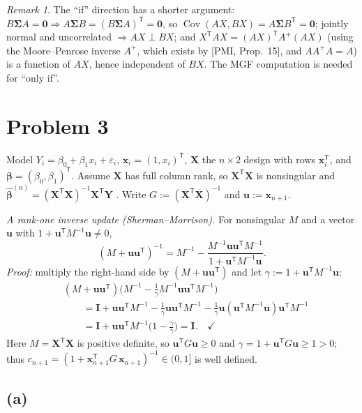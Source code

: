 \documentclass[11pt]{article}
\DeclareMathOperator{\Cov}{Cov}
\newcommand{\bX}{\mathbf{X}}
\newcommand{\bY}{\mathbf{Y}}
\newcommand{\bI}{\mathbf{I}}
\newcommand{\bx}{\mathbf{x}}
\newcommand{\bu}{\mathbf{u}}
\newcommand{\bbeta}{\bm{\beta}}
\newcommand{\bSig}{\bm{\Sigma}}
\newcommand{\T}{^{\mathsf{T}}}
\newcommand{\inv}{^{-1}}
\newcommand{\bhat}[1]{\widehat{#1}}
\theoremstyle{remark}
\newtheorem*{remark}{Remark}
\begin{document}
\begin{remark}
The ``if'' direction has a shorter argument: $B\bSig A=\mathbf0\Rightarrow A\bSig B=(B\bSig A)\T=\mathbf0$, so
$\Cov(AX,BX)=A\bSig B\T=\mathbf0$; jointly normal and uncorrelated $\Rightarrow AX\perp BX$; and
$X\T AX=(AX)\T A^{+}(AX)$ (using the Moore--Penrose inverse $A^{+}$, which exists by [PMI, Prop.~15], and
$AA^{+}A=A$) is a function of $AX$, hence independent of $BX$. The MGF computation is needed for ``only if''.
\end{remark}

\section*{Problem 3}

Model $Y_i=\beta_0+\beta_1x_i+\varepsilon_i$, $\bx_i=(1,x_i)\T$, $\bX$ the $n\times2$ design with rows
$\bx_i\T$, and $\bbeta=(\beta_0,\beta_1)\T$. Assume $\bX$ has full column rank, so $\bX\T\bX$ is nonsingular
and $\bhat{\bbeta}^{(n)}=(\bX\T\bX)\inv\bX\T\bY$ . Write $G:=(\bX\T\bX)\inv$
and $\bu:=\bx_{n+1}$.

\medskip
\noindent\emph{A rank-one inverse update (Sherman--Morrison).} For nonsingular $M$ and a vector $\bu$ with
$1+\bu\T M\inv\bu\ne0$,
\begin{equation*}
(M+\bu\bu\T)\inv=M\inv-\frac{M\inv\bu\bu\T M\inv}{1+\bu\T M\inv\bu}.
\tag{SM}
\end{equation*}
\emph{Proof:} multiply the right-hand side by $(M+\bu\bu\T)$ and let $\gamma:=1+\bu\T M\inv\bu$:
\begin{align*}
&(M+\bu\bu\T)\Big(M\inv-\tfrac{1}{\gamma}M\inv\bu\bu\T M\inv\Big)\\
&\qquad=\bI+\bu\bu\T M\inv-\tfrac1\gamma\bu\bu\T M\inv-\tfrac1\gamma\bu(\bu\T M\inv\bu)\bu\T M\inv\\
&\qquad=\bI+\bu\bu\T M\inv\Big(1-\tfrac{\gamma}{\gamma}\Big)=\bI. \quad\checkmark
\end{align*}
Here $M=\bX\T\bX$ is positive definite, so $\bu\T G\bu\ge0$ and $\gamma=1+\bu\T G\bu\ge1>0$; thus
$c_{n+1}=(1+\bx_{n+1}\T G\,\bx_{n+1})\inv\in(0,1]$ is well defined.

\subsection*{(a)}
\end{document}
